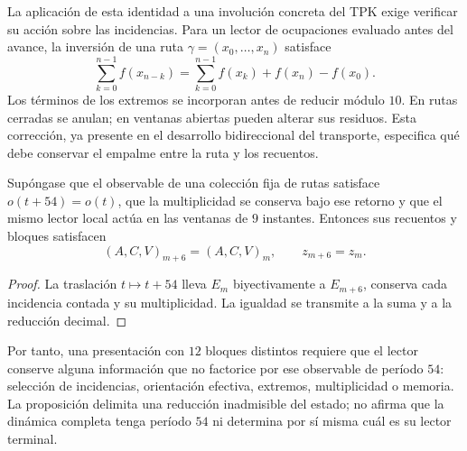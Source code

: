 La aplicación de esta identidad a una involución concreta del TPK exige
verificar su acción sobre las incidencias. Para un lector de ocupaciones
evaluado antes del avance, la inversión de una ruta
\(\gamma=(x_0,\ldots,x_n)\) satisface
\[
 \sum_{k=0}^{n-1}f(x_{n-k})
 =\sum_{k=0}^{n-1}f(x_k)+f(x_n)-f(x_0).
\]
Los términos de los extremos se incorporan antes de reducir módulo
\(10\). En rutas cerradas se anulan; en ventanas abiertas pueden
alterar sus residuos. Esta corrección, ya presente en el desarrollo
bidireccional del transporte, especifica qué debe conservar el empalme
entre la ruta y los recuentos.

\begin{proposition}
Supóngase que el observable de una colección fija de rutas satisface
\(o(t+54)=o(t)\), que la multiplicidad se conserva bajo ese retorno
y que el mismo lector local actúa en las ventanas de \(9\) instantes.
Entonces sus recuentos y bloques satisfacen
\[
 (A,C,V)_{m+6}=(A,C,V)_m,\qquad z_{m+6}=z_m.
\]
\end{proposition}

\begin{proof}
La traslación \(t\mapsto t+54\) lleva \(E_m\) biyectivamente
a \(E_{m+6}\), conserva cada incidencia contada y su multiplicidad.
La igualdad se transmite a la suma y a la reducción decimal.
\end{proof}

Por tanto, una presentación con \(12\) bloques distintos requiere que
el lector conserve alguna información que no factorice por ese observable
de período \(54\): selección de incidencias, orientación efectiva,
extremos, multiplicidad o memoria. La proposición delimita una reducción
inadmisible del estado; no afirma que la dinámica completa tenga
período \(54\) ni determina por sí misma cuál es su lector terminal.
